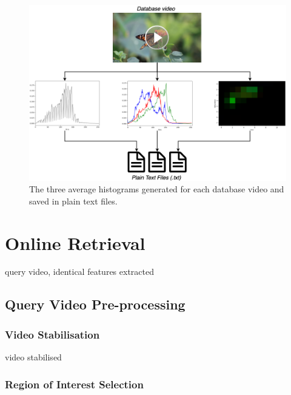 \begin{figure}[h] 
\centerline{\includegraphics[width=\textwidth]{figures/implementation/all_avg_norm_histograms.png}}
\caption{\label{fig:implementation-all_avg_norm_histograms}The three average histograms generated for each database video and saved in plain text files.}
\end{figure}


\section{Online Retrieval}

query video, identical features extracted

\subsection{Query Video Pre-processing}

\subsubsection{Video Stabilisation}

video stabilised

\subsubsection{Region of Interest Selection}


